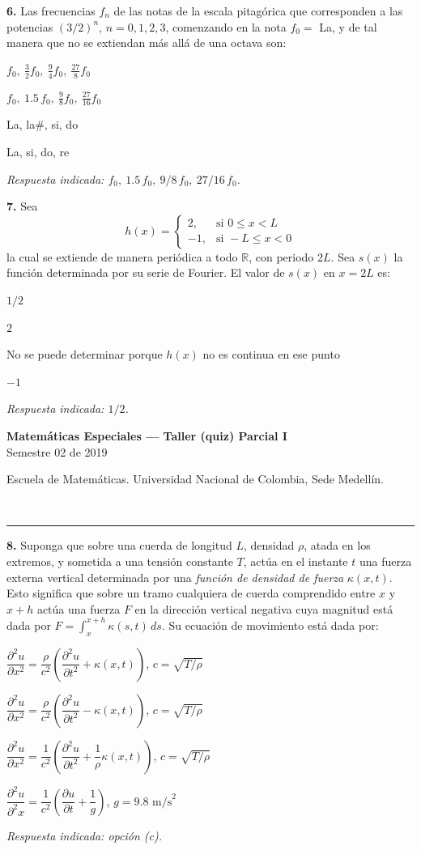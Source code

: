 \documentclass[11pt]{article}
\newcommand{\examheader}{%
  \noindent
  \begin{minipage}[t]{0.6\linewidth}
    {\small\bfseries Matem\'aticas Especiales --- Taller (quiz) Parcial I}\\
    {\small Semestre 02 de 2019}
  \end{minipage}%
  \hfill
  \begin{minipage}[t]{0.35\linewidth}
    \raggedleft\small Escuela de Matem\'aticas. Universidad Nacional de Colombia, Sede Medell\'in.
  \end{minipage}\\[2pt]
  \rule{\linewidth}{0.6pt}
}
\begin{document}
\vspace{10pt}
\textbf{6.} Las frecuencias $f_n$ de las notas de la escala pitag\'orica que corresponden a las potencias $(3/2)^n$, $n=0,1,2,3$, comenzando en la nota $f_0 = $ La, y de tal manera que no se extiendan m\'as all\'a de una octava son:
\begin{opciones}
  \item $f_0,\ \tfrac{3}{2}f_0,\ \tfrac{9}{4}f_0,\ \tfrac{27}{8}f_0$
  \item $f_0,\ 1.5\,f_0,\ \tfrac{9}{8}f_0,\ \tfrac{27}{16}f_0$
  \item La, la\#, si, do
  \item La, si, do, re
\end{opciones}
\textit{Respuesta indicada: $f_0,\ 1.5\,f_0,\ 9/8\,f_0,\ 27/16\,f_0$.}

\vspace{10pt}
\textbf{7.} Sea
\[
h(x) = \begin{cases} 2, & \text{si } 0\leq x < L \\ -1, & \text{si } -L\leq x < 0 \end{cases}
\]
la cual se extiende de manera peri\'odica a todo $\mathbb{R}$, con periodo $2L$. Sea $s(x)$ la funci\'on determinada por su serie de Fourier. El valor de $s(x)$ en $x=2L$ es:
\begin{opciones}
  \item $1/2$
  \item $2$
  \item No se puede determinar porque $h(x)$ no es continua en ese punto
  \item $-1$
\end{opciones}
\textit{Respuesta indicada: $1/2$.}

\clearpage
\examheader
\vspace{6pt}

\textbf{8.} Suponga que sobre una cuerda de longitud $L$, densidad $\rho$, atada en los extremos, y sometida a una tensi\'on constante $T$, act\'ua en el instante $t$ una fuerza externa vertical determinada por una \textit{funci\'on de densidad de fuerza} $\kappa(x,t)$. Esto significa que sobre un tramo cualquiera de cuerda comprendido entre $x$ y $x+h$ act\'ua una fuerza $F$ en la direcci\'on vertical negativa cuya magnitud est\'a dada por $F = \int_x^{x+h} \kappa(s,t)\,ds$. Su ecuaci\'on de movimiento est\'a dada por:
\begin{opciones}
  \item $\dfrac{\partial^2 u}{\partial x^2} = \dfrac{\rho}{c^2}\left(\dfrac{\partial^2 u}{\partial t^2} + \kappa(x,t)\right)$, \quad $c=\sqrt{T/\rho}$
  \item $\dfrac{\partial^2 u}{\partial x^2} = \dfrac{\rho}{c^2}\left(\dfrac{\partial^2 u}{\partial t^2} - \kappa(x,t)\right)$, \quad $c=\sqrt{T/\rho}$
  \item $\dfrac{\partial^2 u}{\partial x^2} = \dfrac{1}{c^2}\left(\dfrac{\partial^2 u}{\partial t^2} + \dfrac{1}{\rho}\kappa(x,t)\right)$, \quad $c=\sqrt{T/\rho}$
  \item $\dfrac{\partial^2 u}{\partial^2 x} = \dfrac{1}{c^2}\left(\dfrac{\partial u}{\partial t} + \dfrac{1}{g}\right)$, \quad $g=9.8\text{ m/s}^2$
\end{opciones}
\textit{Respuesta indicada: opci\'on (c).}
\end{document}
